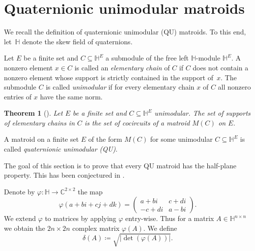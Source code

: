\documentclass[11pt]{article}
\newtheorem{thm}[theo]{Theorem}
\theoremstyle{definition}
\numberwithin{equation}{section}
\newcommand{\C}{{\mathbb C}}
\newcommand{\HH}{{\mathbb H}}
\begin{document}
\section{Quaternionic unimodular matroids}\label{sec:qu}
We recall the definition of quaternionic unimodular (QU) matroids. To this end, let~$\HH$ denote the skew field of quaternions.

\begin{Def}
    Let $E$ be a finite set and $C\subseteq\HH^E$ a submodule of the free left $\HH$-module $\HH^E$. A nonzero element $x\in C$ is called an \emph{elementary chain} of $C$ if $C$ does not contain a nonzero element whose support is strictly contained in the support of~$x$. The submodule $C$ is called \emph{unimodular} if for every elementary chain $x$ of $C$ all nonzero entries of $x$ have the same norm.
\end{Def}

\begin{thm}[{\cite[Theorem~3.7]{skewpartial}}]
    Let $E$ be a finite set and $C\subseteq\HH^E$ unimodular. The set of supports of elementary chains in $C$ is the set of cocircuits of a matroid $M(C)$ on $E$.
\end{thm}

\begin{Def}\label{def:qu}
    A matroid on a finite set $E$ of the form $M(C)$ for some unimodular $C\subseteq\HH^E$ is called \emph{quaternionic unimodular (QU)}.
\end{Def}

The goal of this section is to prove that every QU matroid has the half-plane property. This has been conjectured in \cite[Conjecture~6.9]{skewpartial}.


\begin{Def}
    Denote by $\varphi\colon\HH\to\C^{2\times 2}$ the map 
\begin{equation*}
    \varphi(a+bi+cj+dk)=
    \begin{pmatrix}
        a+bi& c+di\\
        -c+di& a-bi
    \end{pmatrix}.
\end{equation*}
    We extend $\varphi$ to matrices by applying $\varphi$ entry-wise. Thus for a matrix $A\in\HH^{n\times n}$ we obtain the $2n\times2n$ complex matrix $\varphi(A)$. We define
    \begin{equation*}
      \delta(A)\coloneqq \sqrt{|\det(\varphi(A))|}.  
    \end{equation*}
\end{Def}
\end{document}
